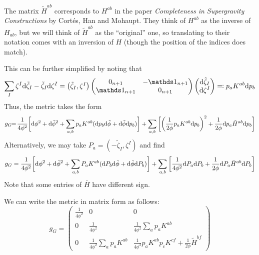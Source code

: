 \documentclass[parskip=half]{scrartcl}
\begin{document}
\begin{rem}
	The matrix $\tilde H^{ab}$ corresponds to $H^{ab}$ in the paper \emph{Completeness in Supergravity Constructions} by Cort\'es, Han and Mohaupt. They think of $H^{ab}$ as the inverse of $H_{ab}$, but we will think of $\tilde H^{ab}$ as the ``original'' one, so translating to their notation comes with an inversion of $H$ (though the position of the indices does match). 
\end{rem}

This can be further simplified by noting that
\begin{equation*}
	\sum_I \zeta^I\d\tilde\zeta_I-\tilde\zeta_I \d \zeta^I=
	\begin{pmatrix}
		\tilde\zeta_I,\zeta^I
	\end{pmatrix}
	\begin{pmatrix}
		0_{n+1} & -\Unit_{n+1}\\ \Unit_{n+1} & 0_{n+1}
	\end{pmatrix}
	\begin{pmatrix}
		\d \tilde \zeta_I \\ \d \zeta^I
	\end{pmatrix}
	\eqqcolon p_a K^{ab} \d p_b
\end{equation*}
Thus, the metric takes the form
\begin{equation*}
	g_G\!\!=\!\frac{1}{4\phi^2}\bigg[\mathrm{d} \phi^2+\mathrm{d} \tilde\phi^2
	+\sum_{a,b}p_a K^{ab} (\mathrm{d} p_b \mathrm{d} \tilde\phi +\mathrm{d} \tilde \phi\mathrm{d} p_b)\bigg]
	+\sum_{a,b}\bigg[\bigg(\frac{1}{2\phi}p_a K^{ab}\mathrm{d} p_b\bigg)^2+ \frac{1}{2\phi}\mathrm{d} p_a \tilde H^{ab} \mathrm{d} p_b\bigg]
\end{equation*}
Alternatively, we may take $P_a=(-\tilde \zeta_I,\zeta^I)$ and find 
\begin{equation*}
	g_G=\frac{1}{4\phi^2}\bigg[\mathrm{d} \phi^2+\mathrm{d} \tilde\phi^2
	+\sum_{a,b}P_a K^{ab}(\mathrm{d} P_b \mathrm{d} \tilde\phi +\mathrm{d} \tilde \phi\mathrm{d} P_b)\bigg]
	+\sum_{a,b}\bigg[\frac{1}{4\phi^2}\mathrm{d} P_a\mathrm{d} P_b+ \frac{1}{2\phi}\mathrm{d} P_a \bar H^{ab} \mathrm{d} P_b\bigg]
\end{equation*}
Note that some entries of $\bar H$ have different sign. 

We can write the metric in matrix form as follows:
\begin{equation*}
	g_G=
	\begin{pmatrix}
		\frac{1}{4\phi^2} & 0 & 0 \\
		0 & \frac{1}{4\phi^2} & \frac{1}{4\phi^2}\sum_a p_a K^{ab}\\
		0 & \frac{1}{4\phi^2}\sum_a p_a K^{ab} & \frac{1}{4\phi^2} p_a K^{ab} p_c K^{cf}+\frac{1}{2\phi}\tilde H^{bf}
	\end{pmatrix}
\end{equation*}
\end{document}

